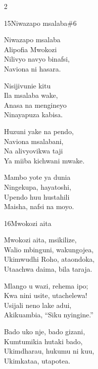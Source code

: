 \documentclass{article}
\begin{document}
\begin{multicols}{2}
\begin{hymn}{15}{Niwazapo msalaba}{\#6}
\begin{stanza}
Niwazapo msalaba\\
Alipofia Mwokozi\\
Nilivyo navyo binafsi,\\
Naviona ni hasara.
\end{stanza}
\begin{stanza}
Nisijivunie kitu\\
Ila msalaba wake,\\
Anasa na mengineyo\\
Ninayapuza kabisa.
\end{stanza}
\begin{stanza}
Huzuni yake na pendo,\\
Naviona msalabani,\\
Na alivyovikwa taji\\
Ya miiba kichwani mwake.
\end{stanza}
\begin{stanza}
Mambo yote ya dunia\\
Ningekupa, hayatoshi,\\
Upendo huu hustahili\\
Maisha, nafsi na moyo.
\end{stanza}
\end{hymn}

\begin{hymn}{16}{Mwokozi aita}{}
\begin{stanza}
Mwokozi aita, msikilize,\\
Walio mbinguni, wakungojea,\\
Ukimwudhi Roho, ataondoka,\\
Utaachwa daima, bila taraja.
\end{stanza}
\begin{stanza}
Mlango u wazi, rehema ipo;\\
Kwa nini usite, utachelewa!\\
Usijali neno lake adui,\\
Akikuambia, ``Siku nyingine.''
\end{stanza}
\begin{stanza}
Bado uko nje, bado gizani,\\
Kumtumikia hutaki bado,\\
Ukimdharau, hukumu ni kuu,\\
Ukimkataa, utapotea.
\end{stanza}
\end{hymn}


\end{multicols}
\end{document}
